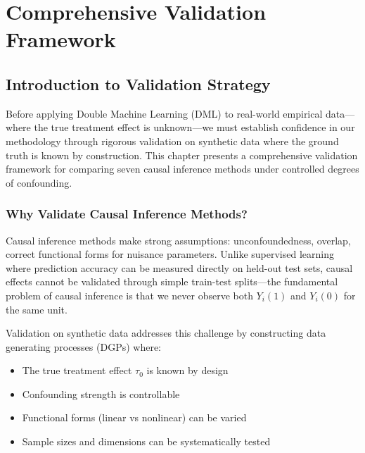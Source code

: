 
\chapter{Comprehensive Validation Framework}


\section{Introduction to Validation Strategy}

Before applying Double Machine Learning (DML) to real-world empirical data---where the true treatment effect is unknown---we must establish confidence in our methodology through rigorous validation on synthetic data where the ground truth is known by construction. This chapter presents a comprehensive validation framework for comparing seven causal inference methods under controlled degrees of confounding.

\subsection{Why Validate Causal Inference Methods?}

Causal inference methods make strong assumptions: unconfoundedness, overlap, correct functional forms for nuisance parameters. Unlike supervised learning where prediction accuracy can be measured directly on held-out test sets, causal effects cannot be validated through simple train-test splits---the fundamental problem of causal inference is that we never observe both $Y_i(1)$ and $Y_i(0)$ for the same unit.

Validation on synthetic data addresses this challenge by constructing data generating processes (DGPs) where:
\begin{itemize}
    \item The true treatment effect $\tau_0$ is known by design
    \item Confounding strength is controllable
    \item Functional forms (linear vs nonlinear) can be varied
    \item Sample sizes and dimensions can be systematically tested
\end{itemize}

